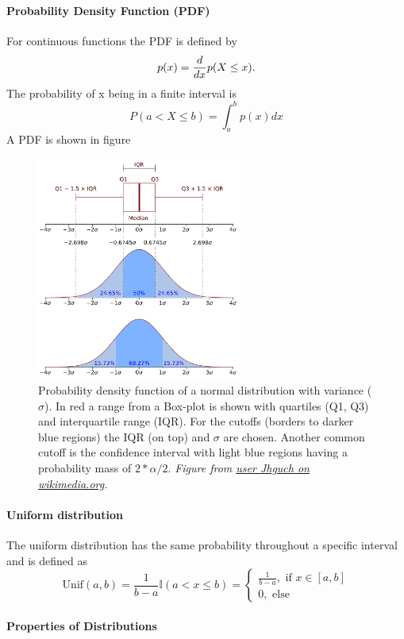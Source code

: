\documentclass[../main.tex]{subfiles}
\begin{document}
\paragraph{Probability Density Function (PDF)}  For continuous functions the PDF is defined by 
        \begin{equation}
            p(x) =  {d \over dx} p(X \leq x).
        \end{equation}
        The probability of x being in a finite interval is
        \begin{equation}
            P(a < X \leq b) = \int_a^b p(x) dx
        \end{equation}
        A PDF is shown in figure
        \begin{figure}
            \centering
            \includegraphics[width=0.6\textwidth]{../figures/Boxplot_vs_PDF.png}
            \caption{Probability density function of a normal distribution with variance ($\sigma$). In red a range from a Box-plot is shown with quartiles (Q1, Q3) and interquartile range (IQR). For the cutoffs (borders to darker blue regions) the IQR (on top) and $\sigma$ are chosen. Another common cutoff is the confidence interval with light blue regions having a probability mass of $2 * \alpha / 2$. \textit{Figure from \href{https://commons.wikimedia.org/wiki/File:Boxplot_vs_PDF.svg}{user Jhguch on wikimedia.org}.}}
            \label{CDF}
        \end{figure}

\paragraph{Uniform distribution} 
        The uniform distribution has the same probability throughout a specific interval and is defined as 
        \[ \text{Unif}(a,b) = \frac{1}{b-a} \mathbb{I}(a < x \leq b) = \begin{cases} 
            \frac{1}{b-a}, \text{ if } x \in [ a,b ] \\
            0, \text{ else}
        \end{cases}
        \]

\paragraph{Properties of Distributions}
\end{document}
